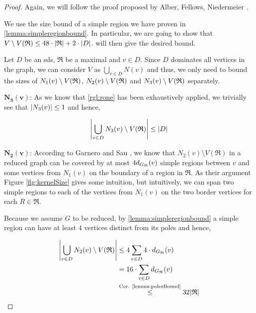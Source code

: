 \begin{proof}
    Again, we will follow the proof proposed by Alber, Fellows, Niedermeier \cite[Proposition 2]{Alber2004}. 
    
    We use the size bound of a simple region we have proven in \cref{lemma:simpleregionbound}. In particular, we are going to show that $V \setminus V(\mathfrak{R}) \leq 48 \cdot \abs{\mathfrak{R}} + 2 \cdot \abs{D}$.  will then give the desired bound.
    
    Let $D$ be an sds, $\mathfrak{R}$ be a maximal \dreg and $v \in D$. Since $D$ dominates all vertices in the graph, we can consider $V$ as $\bigcup_{v \in D}N(v)$ and thus, we only need to bound the sizes of $N_1(v)\setminus {V(\mathfrak{R})} $, $N_2(v) \setminus {V(\mathfrak{R})} $ and $N_3(v) \setminus {V(\mathfrak{R})} $ separately.
    
    \noindent$\mathbf{N_3(v)}$: As we know that \cref{rgl:rone} has been exhaustively applied, we trivially see that $\abs{N_3(v)} \leq 1$ and hence, 
    
    \[\abs{\bigcup_{v \in D}N_3(v) \setminus V(\mathfrak{R})} \leq \abs{D}\]
    
    \noindent$\mathbf{N_2(v)}$: According to Garnero and Sau \cite[Proposition 2]{Garnero2018}, we know that $N_2(v) \setminus V(\mathfrak{R})$ in a reduced graph can be covered by at most $4 d_{G_{\mathfrak{R}}}(v)$ simple regions between $v$ and some vertices from $N_1(v)$ on the boundary of a region in $\mathfrak{R}$. 
    As their argument 
    Figure \ref{fig:kernelSize} gives some intuition, but intuitively, we can span two simple regions to each of the vertices from $N_1(v)$ on the two border vertices for each $R \in \mathfrak{R}$.
    
    Because we assume $G$ to be reduced, by \cref{lemma:simpleregionbound} a simple region can have at least $4$ vertices distinct from its poles and hence,
    
    \begin{equation}
        \begin{split}
            \abs{\bigcup_{v \in D} N_2(v) \setminus V(\mathfrak{R})} &\leq 4 \sum_{v \in D}4 \cdot d_{G_{\mathfrak{R}}}(v) \\
            &= 16 \cdot \sum_{v \in D}d_{G_{\mathfrak{R}}}(v) \\
            &\overset{\text{Cor. \ref{lemma:polesBound}}}{\leq} 32 \abs{\mathfrak{R}}
        \end{split}
    \end{equation}
    
    
    

\end{proof}
